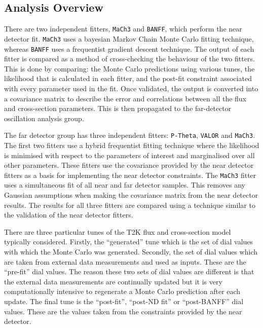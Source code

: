 \subsection{Analysis Overview}
\label{subsec:T2KSKExp_T2K_AnalysisOverview}

There are two independent fitters, \texttt{MaCh3} and \texttt{BANFF}, which perform the near detector fit. \texttt{MaCh3} uses a bayesian Markov Chain Monte Carlo fitting technique, whereas \texttt{BANFF} uses a frequentist gradient descent technique. The output of each fitter is compared as a method of cross-checking the behaviour of the two fitters. This is done by comparing: the Monte Carlo predictions using various tunes, the likelihood that is calculated in each fitter, and the post-fit constraint associated with every parameter used in the fit. Once validated, the output is converted into a covariance matrix to describe the error and correlations between all the flux and cross-section parameters. This is then propagated to the far-detector oscillation analysis group. 

The far detector group has three independent fitters: \texttt{P-Theta}, \texttt{VALOR} and \texttt{MaCh3}. The first two fitters use a hybrid frequentist fitting technique where the likelihood is minimised with respect to the parameters of interest and marginalised over all other parameters. These fitters use the covariance provided by the near detector fitters as a basis for implementing the near detector constraints. The \texttt{MaCh3} fitter uses a simultaneous fit of all near and far detector samples. This removes any Gaussian assumptions when making the covariance matrix from the near detector results. The results for all three fitters are compared using a technique similar to the validation of the near detector fitters.

There are three particular tunes of the T2K flux and cross-section model typically considered. Firstly, the ``generated'' tune which is the set of dial values with which the Monte Carlo was generated. Secondly, the set of dial values which are taken from external data measurements and used as inputs. These are the ``pre-fit'' dial values. The reason these two sets of dial values are different is that the external data measurements are continually updated but it is very computationally intensive to regenerate a Monte Carlo prediction after each update. The final tune is the ``post-fit'', ``post-ND fit'' or ``post-BANFF'' dial values. These are the values taken from the constraints provided by the near detector.

